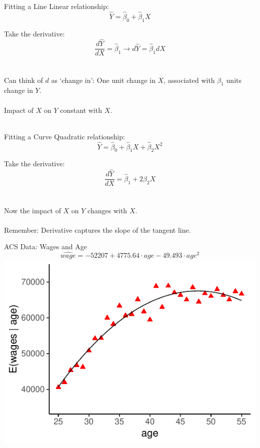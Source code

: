 \documentclass{./../div_teaching_slides}
\begin{document}
\begin{frame}{Fitting a Line}
Linear relationship:
$$ \hat{Y} = \hat{\beta}_0 + \hat{\beta}_1 X   $$

Take the derivative:
$$ \frac{d \hat{Y}}{dX} = \hat{\beta}_1 \rightarrow d \hat{Y} = \hat{\beta}_1 dX  $$ \\~\\

Can think of $d$ as `change in':
One unit change in $X$, associated with $\beta_1$ units change in $Y$. \\~\\
Impact of $X$ on $Y$ constant with $X$. \\~\\
\end{frame}


\begin{frame}{Fitting a Curve}
Quadratic relationship:
$$ \hat{Y} = \hat{\beta}_0 + \hat{\beta}_1 X + \hat{\beta}_2 X^2   $$

Take the derivative:
$$ \frac{d \hat{Y}}{dX} = \hat{\beta}_1 + 2 \hat{\beta}_2 X $$ \\~\\

Now the impact of $X$ on $Y$ changes with $X$. \\~\\
Remember: Derivative captures the slope of the tangent line.

\end{frame}

\begin{frame}{ACS Data: Wages and Age}
\centering \vspace{-2em}
$$ \hat{wage} = -52207 + 4775.64 \cdot age -49.493 \cdot age^2   $$
\includegraphics{./../../output/scatter_age_wage_qfit.pdf}
\end{frame}
\end{document}
